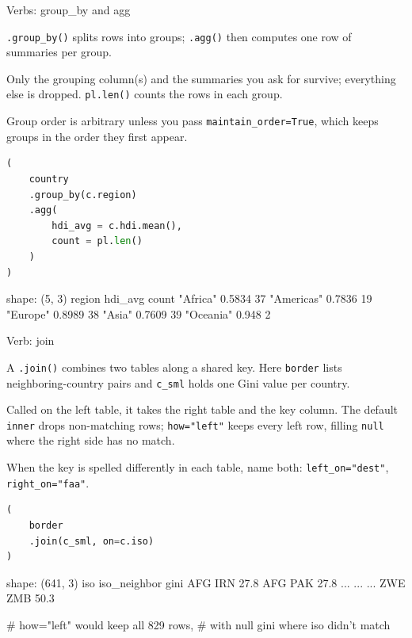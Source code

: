\documentclass[8pt,aspectratio=169]{beamer}
\begin{document}
\begin{frame}[fragile]{Verbs: group\_by and agg}
\begin{splitcode}{%

\texttt{.group\_by()} splits rows into groups; \texttt{.agg()} then computes one row of summaries per group.

Only the grouping column(s) and the summaries you ask for survive; everything else is dropped. \texttt{pl.len()} counts the rows in each group.

Group order is arbitrary unless you pass \texttt{maintain\_order=True}, which keeps groups in the order they first appear.

}
\begin{lstlisting}[language=Python]
(
    country
    .group_by(c.region)
    .agg(
        hdi_avg = c.hdi.mean(),
        count = pl.len()
    )
)
\end{lstlisting}
\begin{codeoutput}
shape: (5, 3)
region      hdi_avg  count
"Africa"    0.5834   37
"Americas"  0.7836   19
"Europe"    0.8989   38
"Asia"      0.7609   39
"Oceania"   0.948    2
\end{codeoutput}
\end{splitcode}
\end{frame}

\begin{frame}[fragile]{Verb: join}
\begin{splitcode}{%

A \texttt{.join()} combines two tables along a shared key. Here \texttt{border} lists neighboring-country pairs and \texttt{c\_sml} holds one Gini value per country.

Called on the left table, it takes the right table and the key column. The default \texttt{inner} drops non-matching rows; \texttt{how="left"} keeps every left row, filling \texttt{null} where the right side has no match.

When the key is spelled differently in each table, name both: \texttt{left\_on="dest"}, \texttt{right\_on="faa"}.

}
\begin{lstlisting}[language=Python]
(
    border
    .join(c_sml, on=c.iso)
)
\end{lstlisting}
\begin{codeoutput}
shape: (641, 3)
iso  iso_neighbor  gini
AFG  IRN           27.8
AFG  PAK           27.8
...  ...           ...
ZWE  ZMB           50.3

# how="left" would keep all 829 rows,
# with null gini where iso didn't match
\end{codeoutput}
\end{splitcode}
\end{frame}
\end{document}
